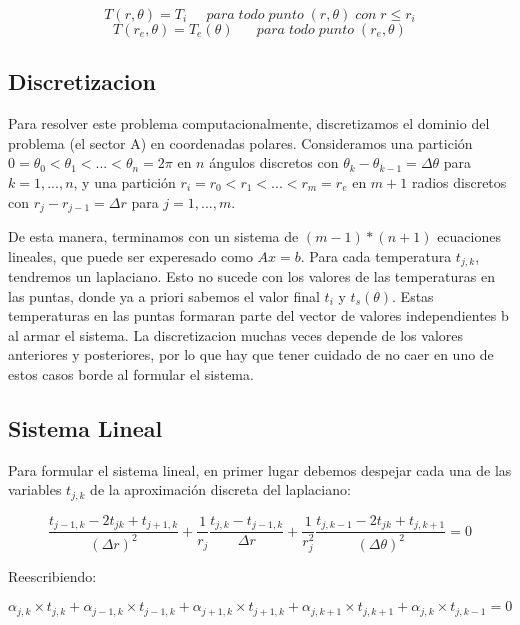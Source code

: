 \begin{equation}
T(r,\theta) = T_i \;\;\;\;\;para\;todo\;punto\;(r,\theta)\;con\;r\leq r_i
\end{equation}
\begin{equation}
T(r_e,\theta) = T_e(\theta) \;\;\;\;\;\;para\;todo\;punto\;(r_e,\theta)
\end{equation}

\subsection{Discretizacion}

Para resolver este problema computacionalmente, discretizamos el dominio del problema (el sector A) en coordenadas polares. Consideramos una partici\'on $0 = \theta_0 < \theta_1 < ... < \theta_n = 2\pi$ en $n$ \'angulos discretos con $\theta_k-\theta_{k-1} = \Delta\theta$ para $k = 1,...,n$, y una partici\'on $r_i = r_0 < r_1 < ... < r_m = r_e$ en $m+1$ radios discretos con $r_j - r_{j-1} = \Delta r$ para $j = 1,...,m$.

De esta manera, terminamos con un sistema de $(m-1)*(n+1)$ ecuaciones lineales, que puede ser experesado como $Ax = b$. Para cada temperatura $t_{j,k}$, tendremos un laplaciano. Esto no sucede con los valores de las temperaturas en las puntas, donde ya a priori sabemos el valor final $t_i$ y $t_s(\theta)$. Estas temperaturas en las puntas formaran parte del vector de valores independientes b al armar el sistema. La discretizacion muchas veces depende de los valores anteriores y posteriores, por lo que hay que tener cuidado de no caer en uno de estos casos borde al formular el sistema.

\subsection{Sistema Lineal}
Para formular el sistema lineal, en primer lugar debemos despejar cada una de las variables $t_{j,k}$ de la aproximación discreta del laplaciano:

\begin{equation}\label{calor}
\frac{t_{j-1,k}-2t_{jk}+t_{j+1,k}}{(\Delta r)^2}
+ \frac{1}{r_j}
\frac{t_{j,k}-t_{j-1,k}}{\Delta r}
+
\frac{1}{r_j^2}
\frac{t_{j,k-1}-2t_{jk}+t_{j,k+1}}{(\Delta \theta)^2} = 0
\end{equation}

Reescribiendo:

\begin{equation}
\alpha_{j,k} \times t_{j,k} + \alpha_{j-1,k} \times t_{j-1,k} + \alpha_{j+1,k} \times t_{j+1,k} + \alpha_{j,k+1} \times t_{j,k+1} + \alpha_{j,k} \times t_{j,k-1} = 0
\end{equation}

